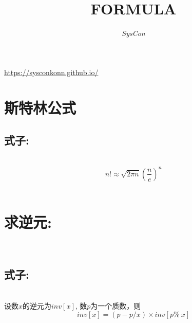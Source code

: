 \documentclass{article}
\begin{document}
\title{\huge{FORMULA}}
\author{\emph{SysCon}}
\maketitle
\begin{center}
  \url{https://sysconkonn.github.io/}
\end{center}

\newpage

\begin{CJK}{UTF8}{gbsn}
  \begin{itemize}
    \section{斯特林公式}
    \subsection{式子:}\\
    $$ n! \approx \sqrt{2\pi n} (\frac{n}{e})^n $$\\
    \section{求逆元: }\\
    \subsection{式子:}\\
    设数\(x\)的逆元为\(inv[x]\), 数\(p\)为一个质数，则\[inv[x] = (p - p / x) \times inv[p  \%\ x]\]

\end{itemize}
\end{CJK}
\end{document}
